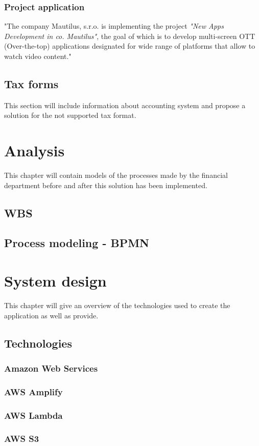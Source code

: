 \documentclass[12pt,oneside]{fithesis2}
\begin{document}
    \subsection{Project application}
    "The company Mautilus, s.r.o. is implementing the project \textit{"New Apps Development in co. Mautilus"}, the goal of which is to develop multi-screen OTT (Over-the-top) applications designated for wide range of platforms that allow to watch video content." \cite{maueusubsidy}
    \section{Tax forms}
    This section will include information about accounting system and propose a solution for the not supported tax format.
    \chapter{Analysis}
    This chapter will contain models of the processes made by the financial department before and after this solution has been implemented.
    \section{WBS}
    \section{Process modeling - BPMN}
    \chapter{System design}
    This chapter will give an overview of the technologies used to create the application as well as provide.
    \section{Technologies}
    \subsection{Amazon Web Services}
    \subsection{AWS Amplify}
    \subsection{AWS Lambda}
    \subsection{AWS S3}
\end{document}
